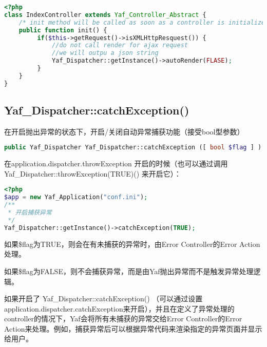 \begin{lstlisting}[language=PHP]
<?php
class IndexController extends Yaf_Controller_Abstract {
    /* init method will be called as soon as a controller is initialized */ 
    public function init() {
         if($this->getRequest()->isXMLHttpResquest()) {
             //do not call render for ajax request
             //we will outpu a json string
             Yaf_Dispatcher::getInstance()->autoRender(FLASE);
         }
    }
}
\end{lstlisting}





\subsection{Yaf\_Dispatcher::catchException()}

在开启抛出异常的状态下，开启/关闭自动异常捕获功能（接受bool型参数）


\begin{lstlisting}[language=PHP]
public Yaf_Dispatcher Yaf_Dispatcher::catchException ([ bool $flag ] )
\end{lstlisting}

在application.dispatcher.throwException 开启的时候（也可以通过调用 Yaf\_Dispatcher::throwException(TRUE)() 来开启它）：

\begin{lstlisting}[language=PHP]
<?php
$app = new Yaf_Application("conf.ini");
/**
 * 开启捕获异常
 */
Yaf_Dispatcher::getInstance()->catchException(TRUE);
\end{lstlisting}

\begin{compactitem}
\item 如果\$flag为TRUE，则会在有未捕获的异常时，由Error Controller的Error Action处理。
\item 如果\$flag为FALSE，则不会捕获异常，而是由Yaf抛出异常而不是触发异常处理逻辑。
\end{compactitem}




如果开启了 Yaf\_Dispatcher::catchException() （可以通过设置application.dispatcher.catchException来开启），并且在定义了异常处理的controller的情况下，Yaf会将所有未捕获的异常交给Error Controller的Error Action来处理。例如，捕获异常后可以根据异常代码来渲染指定的异常页面并显示给用户。

